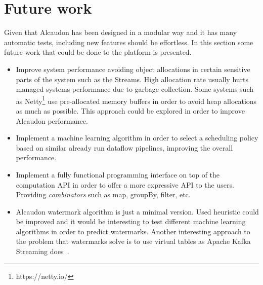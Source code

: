 \section{Future work}

Given that Alcaudon has been designed in a modular way and it has many automatic
tests, including new features should be effortless. In this section some future work
that could be done to the platform is presented.

\begin{itemize}
\item Improve system performance avoiding object allocations in certain
  sensitive parts of the system such as the Streams. High allocation rate
  usually hurts managed systems performance due to garbage collection. Some
  systems such as Netty\footnote{https://netty.io/} use pre-allocated memory buffers
  in order to avoid heap allocations as much as possible. This approach could be
  explored in order to improve Alcaudon performance.
\item Implement a machine learning algorithm in order to select a scheduling policy
  based on similar already run dataflow pipelines, improving the overall performance.
\item Implement a fully functional programming interface on top of the
  computation API in order to offer a more expressive API to the users.
  Providing \textit{combinators} such as map, groupBy, filter, etc.
\item Alcaudon watermark algorithm is just a minimal version. Used heuristic
  could be improved and it would be interesting to test different machine
  learning algorithms in order to predict watermarks. Another interesting
  approach to the problem that watermarks solve is to use virtual tables as
  Apache Kafka Streaming does~\cite{kafkastreams}.
\end{itemize}
